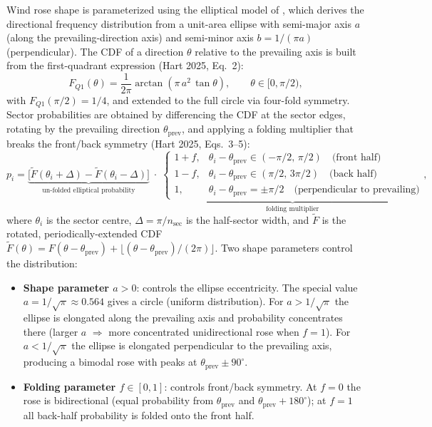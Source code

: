 \documentclass[wes, manuscript]{copernicus}
\begin{document}
Wind rose shape is parameterized using the elliptical model of \citet{Hart2025}, which derives the directional frequency distribution from a unit-area ellipse with semi-major axis $a$ (along the prevailing-direction axis) and semi-minor axis $b = 1/(\pi a)$ (perpendicular).
The CDF of a direction $\theta$ relative to the prevailing axis is built from the first-quadrant expression (Hart 2025, Eq.~2):
\begin{equation}\label{eq:hart-cdf-q1}
    F_{Q1}(\theta) = \frac{1}{2\pi}\arctan\!\left(\pi\,a^{2}\,\tan\theta\right), \qquad \theta \in [0, \pi/2),
\end{equation}
with $F_{Q1}(\pi/2) = 1/4$, and extended to the full circle via four-fold symmetry.
Sector probabilities are obtained by differencing the CDF at the sector edges, rotating by the prevailing direction $\theta_\text{prev}$, and applying a folding multiplier that breaks the front/back symmetry (Hart 2025, Eqs.~3--5):
\begin{equation}\label{eq:hart-sector}
    p_i
    = \underbrace{\bigl[\tilde F(\theta_i + \Delta) - \tilde F(\theta_i - \Delta)\bigr]}_{\text{un-folded elliptical probability}}
      \;\cdot\;
    \underbrace{
      \begin{cases}
        1 + f, & \theta_i - \theta_\text{prev} \in (-\pi/2,\,\pi/2) \quad \text{(front half)} \\
        1 - f, & \theta_i - \theta_\text{prev} \in (\pi/2,\,3\pi/2) \quad \text{(back half)} \\
        1, & \theta_i - \theta_\text{prev} = \pm\pi/2 \quad \text{(perpendicular to prevailing)}
      \end{cases}
    }_{\text{folding multiplier}},
\end{equation}
where $\theta_i$ is the sector centre, $\Delta = \pi/n_\text{sec}$ is the half-sector width, and $\tilde F$ is the rotated, periodically-extended CDF $\tilde F(\theta) = F(\theta - \theta_\text{prev}) + \lfloor (\theta - \theta_\text{prev})/(2\pi)\rfloor$.
Two shape parameters control the distribution:
\begin{itemize}
    \item \textbf{Shape parameter $a > 0$}: controls the ellipse eccentricity.
    The special value $a = 1/\sqrt{\pi} \approx 0.564$ gives a circle (uniform distribution).
    For $a > 1/\sqrt{\pi}$ the ellipse is elongated along the prevailing axis and probability concentrates there (larger $a$ $\Rightarrow$ more concentrated unidirectional rose when $f = 1$).
    For $a < 1/\sqrt{\pi}$ the ellipse is elongated perpendicular to the prevailing axis, producing a bimodal rose with peaks at $\theta_\text{prev} \pm 90^\circ$.
    \item \textbf{Folding parameter $f \in [0,1]$}: controls front/back symmetry.
    At $f = 0$ the rose is bidirectional (equal probability from $\theta_\text{prev}$ and $\theta_\text{prev} + 180^\circ$); at $f = 1$ all back-half probability is folded onto the front half.
\end{itemize}
\end{document}
